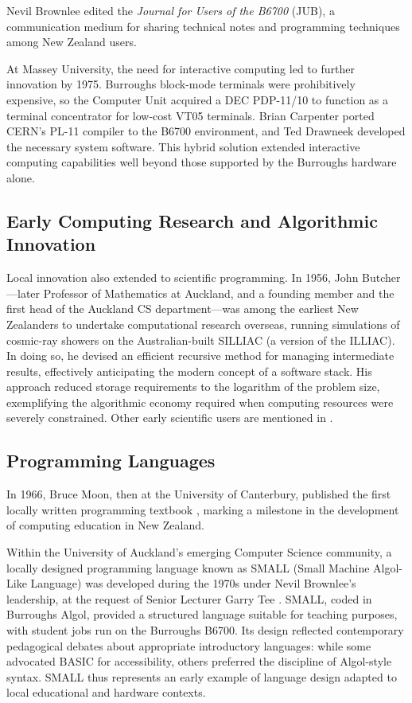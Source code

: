 \documentclass{IEEEcsmag}
\begin{document}
Nevil Brownlee edited the \emph{Journal for Users of the B6700} (JUB), a communication medium for sharing technical notes and programming techniques among New Zealand users.

At Massey University, the need for interactive computing led to further innovation by 1975. Burroughs block-mode terminals were prohibitively expensive, so the Computer Unit acquired a DEC PDP-11/10 to function as a terminal concentrator for low-cost VT05 terminals. Brian Carpenter ported CERN’s PL-11 compiler to the B6700 environment, and Ted Drawneek developed the necessary system software. This hybrid solution extended interactive computing capabilities well beyond those supported by the Burroughs hardware alone.

\subsection{Early Computing Research and Algorithmic Innovation}
\vspace*{5pt}
Local innovation also extended to scientific programming. In 1956, John Butcher—later Professor of Mathematics at Auckland, and a founding member and the first head of the Auckland CS department—was among the earliest New Zealanders to undertake computational research overseas, running simulations of cosmic-ray showers on the Australian-built SILLIAC (a version of the ILLIAC). In doing so, he devised an efficient recursive method for managing intermediate results, effectively anticipating the modern concept of a software stack. His approach reduced storage requirements to the logarithm of the problem size, exemplifying the algorithmic economy required when computing resources were severely constrained. Other early scientific users are mentioned in \cite{pioneers}.

\subsection{Programming Languages}
\vspace*{5pt}
In 1966, Bruce Moon, then at the University of Canterbury, published the first locally written programming textbook \cite{MoonProgramming}, marking a milestone in the development of computing education in New Zealand.

Within the University of Auckland’s emerging Computer Science community, a locally designed programming language known as SMALL (Small Machine Algol-Like Language) was developed during the 1970s under Nevil Brownlee’s leadership, at the request of Senior Lecturer Garry Tee \cite{TeeHunt}. SMALL, coded in Burroughs Algol, provided a structured language suitable for teaching purposes, with student jobs run on the Burroughs B6700. Its design reflected contemporary pedagogical debates about appropriate introductory languages: while some advocated BASIC for accessibility, others preferred the discipline of Algol-style syntax. SMALL thus represents an early example of language design adapted to local educational and hardware contexts.
\end{document}
